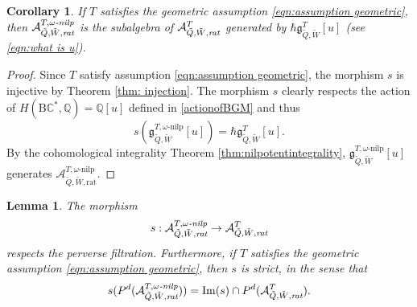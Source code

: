 \documentclass{amsart}
\newtheorem{lemma}[theorem]{Lemma}
\newtheorem{corollary}[theorem]{Corollary}
\def\BQ{{\mathbb{Q}}}
\def\tQ{\tilde{Q}}
\def\tW{\tilde{W}}
\def\khrate{\mathcal{A}^{T}_{\tQ,\tW,\emph{rat}}}
\def\kharat{\mathcal{A}^{T,\omega\text{-nilp}}_{\tQ,\tW,\text{rat}}}
\def\kharate{\mathcal{A}^{T,\omega\emph{-nilp}}_{\tQ,\tW,\emph{rat}}}
\def\tbpsw{\mathfrak{g}^{T,\omega\text{-nilp}}_{\tilde{Q},\tilde{W}}}
\def\tbps{\mathfrak{g}^T_{\tilde{Q},\tilde{W}}}
\begin{document}
\medskip

\begin{corollary} \label{cor:nilpotentassubalgebra}
If $T$ satisfies the geometric assumption \eqref{eqn:assumption geometric}, then $\kharate$ is the subalgebra of $\khrate$ generated by $\hbar \tbps[u]$ (see \eqref{eqn:what is u}).
\end{corollary}

\medskip

\begin{proof} Since $T$ satisfy assumption \eqref{eqn:assumption geometric}, the morphism $s$ is injective by Theorem \ref{thm: injection}. The morphism $s$ clearly respects the action of $H(\mathrm{B}\mathbb{C}^*,\BQ)=\mathbb{Q}[u]$ defined in \eqref{actionofBGM} and thus 
$$
s(\tbpsw[u]) = \hbar \tbps[u].
$$
By the cohomological integrality Theorem \ref{thm:nilpotentintegrality}, $\tbpsw[u]$ generates $\kharat$. \end{proof}

\medskip 

\begin{lemma}
The morphism \[ s: \kharate \rightarrow \khrate \] respects the perverse filtration. Furthermore, if $T$ satisfies the geometric assumption \eqref{eqn:assumption geometric}, then $s$ is strict, in the sense that \[ s(P^d(\kharate))= \mathrm{Im}(s) \cap P^d(\khrate).\]
\end{lemma}

\medskip 
\end{document}
